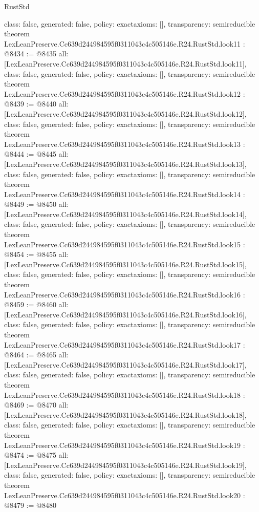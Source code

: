 \begin{lexlean}{RustStd}
\begin{coremodule}
{  class: false,
  generated: false,
  policy: exact{axioms: []},
  transparency: semireducible
}
theorem LexLeanPreserve.Cc639d244984595f0311043c4c505146e.R24.RustStd.look11 : @8434 := @8435 {
  all: [LexLeanPreserve.Cc639d244984595f0311043c4c505146e.R24.RustStd.look11],
  class: false,
  generated: false,
  policy: exact{axioms: []},
  transparency: semireducible
}
theorem LexLeanPreserve.Cc639d244984595f0311043c4c505146e.R24.RustStd.look12 : @8439 := @8440 {
  all: [LexLeanPreserve.Cc639d244984595f0311043c4c505146e.R24.RustStd.look12],
  class: false,
  generated: false,
  policy: exact{axioms: []},
  transparency: semireducible
}
theorem LexLeanPreserve.Cc639d244984595f0311043c4c505146e.R24.RustStd.look13 : @8444 := @8445 {
  all: [LexLeanPreserve.Cc639d244984595f0311043c4c505146e.R24.RustStd.look13],
  class: false,
  generated: false,
  policy: exact{axioms: []},
  transparency: semireducible
}
theorem LexLeanPreserve.Cc639d244984595f0311043c4c505146e.R24.RustStd.look14 : @8449 := @8450 {
  all: [LexLeanPreserve.Cc639d244984595f0311043c4c505146e.R24.RustStd.look14],
  class: false,
  generated: false,
  policy: exact{axioms: []},
  transparency: semireducible
}
theorem LexLeanPreserve.Cc639d244984595f0311043c4c505146e.R24.RustStd.look15 : @8454 := @8455 {
  all: [LexLeanPreserve.Cc639d244984595f0311043c4c505146e.R24.RustStd.look15],
  class: false,
  generated: false,
  policy: exact{axioms: []},
  transparency: semireducible
}
theorem LexLeanPreserve.Cc639d244984595f0311043c4c505146e.R24.RustStd.look16 : @8459 := @8460 {
  all: [LexLeanPreserve.Cc639d244984595f0311043c4c505146e.R24.RustStd.look16],
  class: false,
  generated: false,
  policy: exact{axioms: []},
  transparency: semireducible
}
theorem LexLeanPreserve.Cc639d244984595f0311043c4c505146e.R24.RustStd.look17 : @8464 := @8465 {
  all: [LexLeanPreserve.Cc639d244984595f0311043c4c505146e.R24.RustStd.look17],
  class: false,
  generated: false,
  policy: exact{axioms: []},
  transparency: semireducible
}
theorem LexLeanPreserve.Cc639d244984595f0311043c4c505146e.R24.RustStd.look18 : @8469 := @8470 {
  all: [LexLeanPreserve.Cc639d244984595f0311043c4c505146e.R24.RustStd.look18],
  class: false,
  generated: false,
  policy: exact{axioms: []},
  transparency: semireducible
}
theorem LexLeanPreserve.Cc639d244984595f0311043c4c505146e.R24.RustStd.look19 : @8474 := @8475 {
  all: [LexLeanPreserve.Cc639d244984595f0311043c4c505146e.R24.RustStd.look19],
  class: false,
  generated: false,
  policy: exact{axioms: []},
  transparency: semireducible
}
theorem LexLeanPreserve.Cc639d244984595f0311043c4c505146e.R24.RustStd.look20 : @8479 := @8480 {
}
\end{coremodule}
\end{lexlean}
